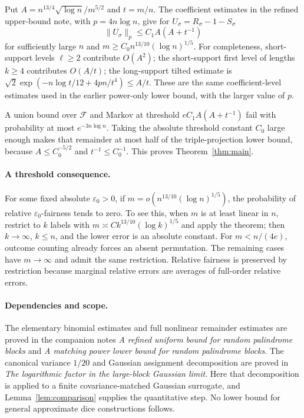 \documentclass[11pt]{article}
\begin{document}
Put $A=n^{13/4}\sqrt{\log n}/m^{5/2}$ and $t=m/n$.
The coefficient estimates in the refined upper-bound note, with
$p=4n\log n$, give for $U_\sigma=R_\sigma-1-S_\sigma$
\[
 \|U_\sigma\|_p\leq C_1 A(A+t^{-1})
\]
for sufficiently large $n$ and $m\geq C_0n^{13/10}(\log n)^{1/5}$.
For completeness, short-support levels $\ell\geq2$ contribute
$O(A^2)$; the short-support first level of lengths $k\geq4$ contributes
$O(A/t)$; the long-support tilted estimate is
$\sqrt2\exp(-n\log t/12+4pn/t^4)\leq A/t$.
These are the same coefficient-level estimates used in the earlier
power-only lower bound, with the larger value of $p$.

A union bound over $\mathcal F$ and Markov at threshold
$e C_1A(A+t^{-1})$ fail with probability at most $e^{-3n\log n}$.
Taking the absolute threshold constant $C_0$ large enough makes that
remainder at most half of the triple-projection lower bound, because
$A\leq C_0^{-5/2}$ and $t^{-1}\leq C_0^{-1}$.
This proves Theorem~\ref{thm:main}.

\paragraph{A threshold consequence.}
For some fixed absolute $\varepsilon_0>0$, if
$m=o(n^{13/10}(\log n)^{1/5})$, the probability of relative
$\varepsilon_0$-fairness tends to zero. To see this, when $m$ is at least
linear in $n$, restrict to $k$ labels with
$m\asymp Ck^{13/10}(\log k)^{1/5}$ and apply the theorem; then
$k\to\infty$, $k\leq n$, and the lower error is an absolute constant.
For $m<n/(4e)$, outcome counting already forces an absent permutation.
The remaining cases have $m\to\infty$ and admit the same restriction.
Relative fairness is preserved by restriction because marginal relative
errors are averages of full-order relative errors.

\paragraph{Dependencies and scope.}
The elementary binomial estimates and full nonlinear remainder estimates
are proved in the companion notes
\emph{A refined uniform bound for random palindrome blocks} and
\emph{A matching power lower bound for random palindrome blocks}.
The canonical variance $1/20$ and Gaussian assignment decomposition are
proved in \emph{The logarithmic factor in the large-block Gaussian limit}.
Here that decomposition is applied to a finite covariance-matched Gaussian
surrogate, and Lemma~\ref{lem:comparison} supplies the quantitative step.
No lower bound for general approximate dice constructions follows.
\end{document}
